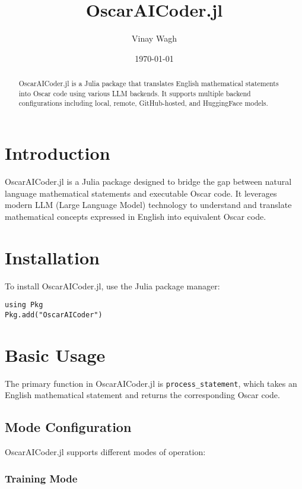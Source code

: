 \documentclass[11pt,a4paper]{article}
\title{\textbf{OscarAICoder.jl}}
\author{Vinay Wagh}
\date{\today}
\begin{document}
\maketitle

\begin{abstract}
OscarAICoder.jl is a Julia package that translates English mathematical statements into Oscar code using various LLM backends. It supports multiple backend configurations including local, remote, GitHub-hosted, and HuggingFace models.
\end{abstract}

\tableofcontents

\section{Introduction}

OscarAICoder.jl is a Julia package designed to bridge the gap between natural language mathematical statements and executable Oscar code. It leverages modern LLM (Large Language Model) technology to understand and translate mathematical concepts expressed in English into equivalent Oscar code.

\section{Installation}

To install OscarAICoder.jl, use the Julia package manager:

\begin{lstlisting}
using Pkg
Pkg.add("OscarAICoder")
\end{lstlisting}

\section{Basic Usage}

The primary function in OscarAICoder.jl is \texttt{process\_statement}, which takes an English mathematical statement and returns the corresponding Oscar code.

\subsection{Mode Configuration}

OscarAICoder.jl supports different modes of operation:

\subsubsection{Training Mode}
\end{document}
